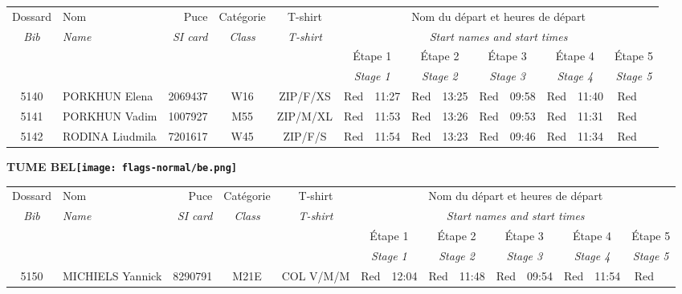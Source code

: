 \documentclass{report}
\begin{document}
  \begin{longtable}{|c|l|r|c|c|*{5}{cc|}}
    Dossard & Nom  & Puce    & Catégorie & T-shirt & \multicolumn{10}{c|}{Nom du départ et heures de départ} \\
    \itshape Bib     & \itshape Name & \itshape SI card & \itshape Class  & \itshape  T-shirt  & \multicolumn{10}{c|}{\itshape Start names and start times} \\
    \hline
    & & & & & \multicolumn{2}{c|}{Étape 1} & \multicolumn{2}{c|}{Étape 2} & \multicolumn{2}{c|}{Étape 3} & \multicolumn{2}{c|}{Étape 4} & \multicolumn{2}{c|}{Étape 5} \\
    & & & & & \multicolumn{2}{c|}{\itshape Stage 1} & \multicolumn{2}{c|}{\itshape Stage 2} & \multicolumn{2}{c|}{\itshape Stage 3} & \multicolumn{2}{c|}{\itshape Stage 4} & \multicolumn{2}{c|}{\itshape Stage 5} \\
    \hline
    5140 & PORKHUN Elena & 2069437 & W16 & ZIP/F/XS & Red & 11:27 & Red & 13:25 & Red & 09:58 & Red & 11:40 & Red &  \\
    5141 & PORKHUN Vadim & 1007927 & M55 & ZIP/M/XL & Red & 11:53 & Red & 13:26 & Red & 09:53 & Red & 11:31 & Red &  \\
    5142 & RODINA Liudmila & 7201617 & W45 & ZIP/F/S & Red & 11:54 & Red & 13:23 & Red & 09:46 & Red & 11:34 & Red &  \\
  \end{longtable}
\newpage
  \Huge \centering \bfseries TUME  BEL\normalfont \footnotesize \sffamily \hfill \texttt{[image: flags-normal/be.png]} \newline 
  \begin{longtable}{|c|l|r|c|c|*{5}{cc|}}
    Dossard & Nom  & Puce    & Catégorie & T-shirt & \multicolumn{10}{c|}{Nom du départ et heures de départ} \\
    \itshape Bib     & \itshape Name & \itshape SI card & \itshape Class  & \itshape  T-shirt  & \multicolumn{10}{c|}{\itshape Start names and start times} \\
    \hline
    & & & & & \multicolumn{2}{c|}{Étape 1} & \multicolumn{2}{c|}{Étape 2} & \multicolumn{2}{c|}{Étape 3} & \multicolumn{2}{c|}{Étape 4} & \multicolumn{2}{c|}{Étape 5} \\
    & & & & & \multicolumn{2}{c|}{\itshape Stage 1} & \multicolumn{2}{c|}{\itshape Stage 2} & \multicolumn{2}{c|}{\itshape Stage 3} & \multicolumn{2}{c|}{\itshape Stage 4} & \multicolumn{2}{c|}{\itshape Stage 5} \\
    \hline
    5150 & MICHIELS Yannick & 8290791 & M21E & COL V/M/M & Red & 12:04 & Red & 11:48 & Red & 09:54 & Red & 11:54 & Red &  \\
  \end{longtable}
\end{document}
